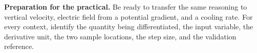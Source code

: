\documentclass[11pt,a4paper]{article}
\begin{document}
\begin{keybox}\textbf{Preparation for the practical.} Be ready to transfer the same reasoning to vertical velocity, electric field from a potential gradient, and a cooling rate. For every context, identify the quantity being differentiated, the input variable, the derivative unit, the two sample locations, the step size, and the validation reference.\end{keybox}
\end{document}

